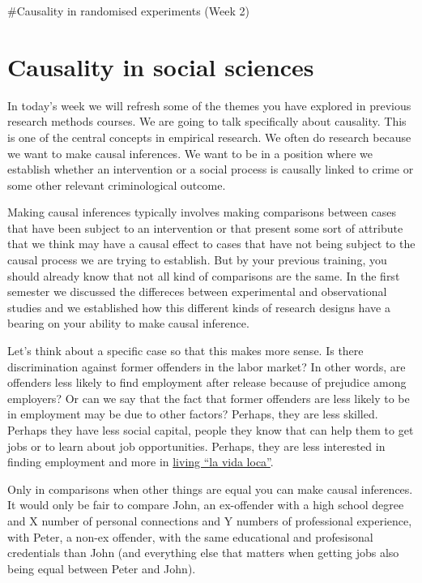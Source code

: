 \documentclass[]{book}
\theoremstyle{definition}
\theoremstyle{definition}
\theoremstyle{definition}
\theoremstyle{remark}
\begin{document}
\#Causality in randomised experiments (Week 2)

\hypertarget{causality-in-social-sciences}{%
\section{Causality in social
sciences}\label{causality-in-social-sciences}}

In today's week we will refresh some of the themes you have explored in
previous research methods courses. We are going to talk specifically
about causality. This is one of the central concepts in empirical
research. We often do research because we want to make causal
inferences. We want to be in a position where we establish whether an
intervention or a social process is causally linked to crime or some
other relevant criminological outcome.

Making causal inferences typically involves making comparisons between
cases that have been subject to an intervention or that present some
sort of attribute that we think may have a causal effect to cases that
have not being subject to the causal process we are trying to establish.
But by your previous training, you should already know that not all kind
of comparisons are the same. In the first semester we discussed the
differeces between experimental and observational studies and we
established how this different kinds of research designs have a bearing
on your ability to make causal inference.

Let's think about a specific case so that this makes more sense. Is
there discrimination against former offenders in the labor market? In
other words, are offenders less likely to find employment after release
because of prejudice among employers? Or can we say that the fact that
former offenders are less likely to be in employment may be due to other
factors? Perhaps, they are less skilled. Perhaps they have less social
capital, people they know that can help them to get jobs or to learn
about job opportunities. Perhaps, they are less interested in finding
employment and more in
\href{https://www.youtube.com/watch?v=p47fEXGabaY}{living ``la vida
loca''}.

Only in comparisons when other things are equal you can make causal
inferences. It would only be fair to compare John, an ex-offender with a
high school degree and X number of personal connections and Y numbers of
professional experience, with Peter, a non-ex offender, with the same
educational and profesisonal credentials than John (and everything else
that matters when getting jobs also being equal between Peter and John).
\end{document}
